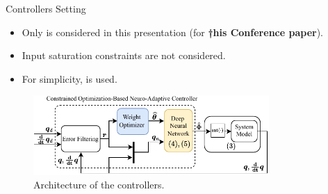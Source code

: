 \documentclass[8pt, aspectratio=169, handout]{beamer}
\newcommand{\ctxt}[2]{\color{#1}{#2}\color{black}}
\begin{document}
\begin{frame}{\insertsubsectionhead}{Controllers Setting}
  
  \begin{itemize}
    \item Only \ctxt{awesome}{weight norm constraint } is considered in this presentation (for \textbf{†his Conference paper}).
    \item Input saturation constraints are not considered.
    \item For simplicity, \ctxt{airforceblue}{single hidden layer NN} is used.
  \end{itemize}

  \centering
  \begin{figure}
    \includegraphics[width=0.8\textwidth]{figures/Controller.drawio.pdf}
    \caption{Architecture of the controllers.}
  \end{figure}

\end{frame}

\end{document}

